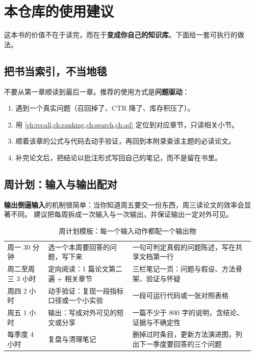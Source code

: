 \section{本仓库的使用建议}

这本书的价值不在于读完，而在于\textbf{变成你自己的知识库}。下面给一套可执行的做法。

\subsection{把书当索引，不当地毯}

不要从第一章顺读到最后一章。推荐的使用方式是\textbf{问题驱动}：

\begin{enumerate}
  \item 遇到一个真实问题（召回掉了、CTR 降了、库存积压了）。
  \item 用 \cref{ch:recall,ch:ranking,ch:search,ch:ad} 定位到对应章节，只读相关小节。
  \item 顺着该章的公式与代码去动手验证，再回到本附录查该主题的必读论文。
  \item 补完论文后，把结论以批注形式写回自己的笔记，而不是留在书里。
\end{enumerate}

\subsection{周计划：输入与输出配对}

\textbf{输出倒逼输入}的机制很简单：当你知道周五要交一份东西，周三读论文的效率会显著不同。
建议把每周拆成一次输入与一次输出，并保证输出一定对外可见。

\begin{table}[htbp]
\centering
\caption{周计划模板：每一个输入动作都配一个输出物}
\label{tab:weekly-plan}
\small
\begin{tabularx}{\textwidth}{L{2.5cm} L{3.0cm} Y}
\toprule
{} &  &  \\
\midrule
周一 30 分钟 & 选一个本周要回答的问题，写下来 &
一句可判定真假的问题陈述，写在共享文档第一行 \\
\midrule
周二至周三 3 小时 & 定向阅读：1 篇论文第二遍 + 相关章节 &
三栏笔记一页：问题与假设、方法骨架、验证与怀疑 \\
\midrule
周四 2 小时 & 动手验证：复现一段指标口径或一个小实验 &
一段可运行代码或一张对照表格 \\
\midrule
周五 1 小时 & 输出：写成对外可见的短文或分享 &
一篇不少于 800 字的说明，含结论、证据与不确定性 \\
\midrule
每季度 4 小时 & 复盘与清理笔记 &
删掉过时条目，更新方法演进图，列出下一季度要回答的三个问题 \\
\bottomrule
\end{tabularx}
\end{table}

